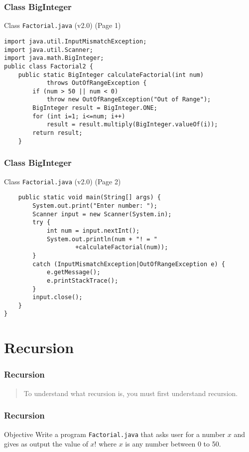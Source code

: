 \documentclass[10pt, compress]{beamer}
\begin{document}
\begin{frame}[fragile]
\frametitle{Class BigInteger}
	\begin{block}{Class \texttt{Factorial.java} (v2.0) (Page 1)}
		\begin{verbatim}
import java.util.InputMismatchException;
import java.util.Scanner;
import java.math.BigInteger;
public class Factorial2 {
	public static BigInteger calculateFactorial(int num)
			throws OutOfRangeException {
		if (num > 50 || num < 0)
			throw new OutOfRangeException("Out of Range");
		BigInteger result = BigInteger.ONE;
		for (int i=1; i<=num; i++)
			result = result.multiply(BigInteger.valueOf(i));
		return result;
	}
		\end{verbatim}
	\end{block}
\end{frame}

\begin{frame}[fragile]
\frametitle{Class BigInteger}
	\begin{block}{Class \texttt{Factorial.java} (v2.0) (Page 2)}		\begin{verbatim}
	public static void main(String[] args) {
		System.out.print("Enter number: ");
		Scanner input = new Scanner(System.in);
		try {
			int num = input.nextInt();
			System.out.println(num + "! = "
					+calculateFactorial(num));
		}
		catch (InputMismatchException|OutOfRangeException e) {
			e.getMessage();
			e.printStackTrace();
		}
		input.close();
	}
}
		\end{verbatim}
	\end{block}
\end{frame}

\section{Recursion}

\begin{frame}[fragile]
\frametitle{Recursion}
\begin{quote}
To understand what recursion is, you must first understand recursion.
\end{quote}
\end{frame}

\begin{frame}[fragile]
\frametitle{Recursion}
	\begin{block}{Objective}
		Write a program \texttt{Factorial.java} that asks user for a number $x$ and gives as output the value of $x!$ where $x$ is any number between 0 to 50.
	\end{block}
\end{frame}
\end{document}
